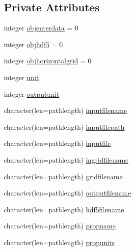\subsection*{Private Attributes}
\begin{DoxyCompactItemize}
\item 
integer \mbox{\hyperlink{structmodulewoaformat_1_1t__woaformat_af55a1e96684b6fdd9882c105f8cab955}{objenterdata}} = 0
\item 
integer \mbox{\hyperlink{structmodulewoaformat_1_1t__woaformat_a6b4ef39d653b9b371cc77ceee5ae0f34}{objhdf5}} = 0
\item 
integer \mbox{\hyperlink{structmodulewoaformat_1_1t__woaformat_a22eae5153d0c2e144dba3d60782a9d59}{objhorizontalgrid}} = 0
\item 
integer \mbox{\hyperlink{structmodulewoaformat_1_1t__woaformat_a8964b61af6c24650052568888eb65c1a}{unit}}
\item 
integer \mbox{\hyperlink{structmodulewoaformat_1_1t__woaformat_aaa295f57d8b2855dd0287383dda05ac3}{outputunit}}
\item 
character(len=pathlength) \mbox{\hyperlink{structmodulewoaformat_1_1t__woaformat_a0171ba39e651a6a9f04850646531e432}{inputfilename}}
\item 
character(len=pathlength) \mbox{\hyperlink{structmodulewoaformat_1_1t__woaformat_a5a84428375ff8cf2e0b3274f4ea511b3}{inputfilepath}}
\item 
character(len=pathlength) \mbox{\hyperlink{structmodulewoaformat_1_1t__woaformat_a43f6e2fb4b19e15f521bf315578cb4fd}{inputfile}}
\item 
character(len=pathlength) \mbox{\hyperlink{structmodulewoaformat_1_1t__woaformat_a7f310d1725a41cc39452963e170a9930}{ingridfilename}}
\item 
character(len=pathlength) \mbox{\hyperlink{structmodulewoaformat_1_1t__woaformat_a4d73c2571cacf9b72daff795e42b0b47}{gridfilename}}
\item 
character(len=pathlength) \mbox{\hyperlink{structmodulewoaformat_1_1t__woaformat_a941ea0ab107e90d1620dc1f27510edbc}{outputfilename}}
\item 
character(len=pathlength) \mbox{\hyperlink{structmodulewoaformat_1_1t__woaformat_af00e466210f202be1ae89ccf1fe85208}{hdf5filename}}
\item 
character(len=pathlength) \mbox{\hyperlink{structmodulewoaformat_1_1t__woaformat_a32e9768e0b81ca2c07cb547a58a6cff1}{propname}}
\item 
character(len=pathlength) \mbox{\hyperlink{structmodulewoaformat_1_1t__woaformat_a002f9152251ec6f9fddd583d4ed8a7da}{propunits}}

\end{DoxyCompactItemize}
